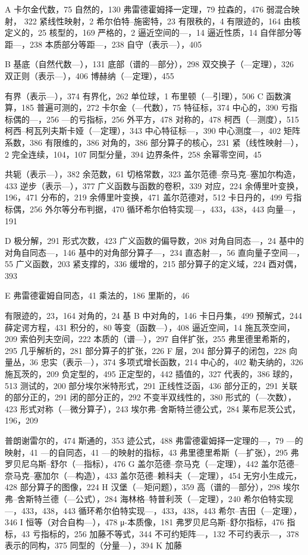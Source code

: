 
A 卡尔金代数，75 自然的，130 弗雷德霍姆择一定理，79 拉森的，476 弱混合映射，
322
紧线性映射，2 希尔伯特--施密特，23 有限秩的，4 有限迹的，164 由核定义的，25 核型的，169 严格的，2 逼近空间的---，14 逼近性质，14 自伴部分等距---，238 本质部分等距---，238 自守（表示---），405

B 基底（自然代数---），131 底部（谱的---部分），298 双交换子（---定理），326 双正则（表示---），406 博赫纳（---定理），455

有界（表示---），374 有界化，262 单位球，1 布里顿（---引理），506 C 函数演算，185 普遍可测的，272 卡尔金（---代数），75 特征标，374 中心的，390 亏指标偶的---，256 ---的亏指标，256 外平方，478 对称的，478 柯西（---测度），515 柯西--柯瓦列夫斯卡娅（---定理），343 中心特征标---，390 中心测度---，402 矩阵系数，386 有限维的，386 对角的，386 部分算子的核心，231 紧（线性映射---），2 完全连续，104，107 同型分量，394 边界条件，258 余幂零空间，45

共轭（表示---），382 余范数，61 切格常数，323 盖尔范德--奈马克--塞加尔构造，433 逆步（表示---），377 广义函数与函数的卷积，339 对应，224 余傅里叶变换，196，471 分布的，219 余傅里叶变换，471 盖尔范德对，512 卡日丹的，499 亏指标偶，256 外尔等分布判据，470 循环希尔伯特实现---，433，438，443 向量---，191

D 极分解，291 形式次数，423 广义函数的偏导数，208 对角自同态---，24 基中的对角自同态---，146 基中的对角部分算子---，234 直态射---，56 直向量子空间---，55 广义函数，203 紧支撑的，336 缓增的，215 部分算子的定义域，224 酉对偶，393

E 弗雷德霍姆自同态，41 乘法的，186 里斯的，46

有限迹的，23，164 对角的，24 基 B 中对角的，146 卡日丹集，499 预解式，244 薛定谔方程，431 积分的，80 等变（函数---），408 逼近空间，14 施瓦茨空间，209 索伯列夫空间，222 本质的（谱---），297 自伴扩张，255 弗里德里希斯的，295 几乎解析的，281 部分算子的扩张，226 F 层，204 部分算子的闭包，228 向量丛，36 忠实（表示---），374 多项式增长函数，214 中心的，402 勒夫纳的，326 施瓦茨的，209 负定型的，495 正定型的，442 插值的，327 代表的，386 球的，513 测试的，200 部分埃尔米特形式，291 正线性泛函，436 部分正的，291 关联的部分正的，291 闭的部分正的，292 不变半双线性的，380 形式的（---次数），423 形式对称（---微分算子），243 埃尔弗--舍斯特兰德公式，284 莱布尼茨公式，196，209

普朗谢雷尔的，474 斯通的，353 迹公式，488 弗雷德霍姆择一定理的---，79 ---的映射，41 ---的自同态，41 ---的映射的指标，43 弗里德里希斯（---扩张），295 弗罗贝尼乌斯--舒尔（---指标），476 G 盖尔范德--奈马克（---定理），442 盖尔范德--奈马克--塞加尔（---构造），433 盖尔范德--赖科夫（---定理），454 无穷小生成元，428 部分算子的图像，224 H 汉堡（---矩问题），359 高（谱的---部分），298 埃尔弗--舍斯特兰德（---公式），284 海林格--特普利茨（---定理），240 希尔伯特实现---，433，438，443 循环希尔伯特实现---，433，438，443 希尔--吉田（---定理），346 I 恒等（对合自构---），478 μ-本质像，181 弗罗贝尼乌斯--舒尔指标，476 指标，43 亏指标的，256 加藤不等式，344 不可约矩阵---，132 不可约表示---，378 表示的同构，375 同型的（分量---），394 K 加藤

